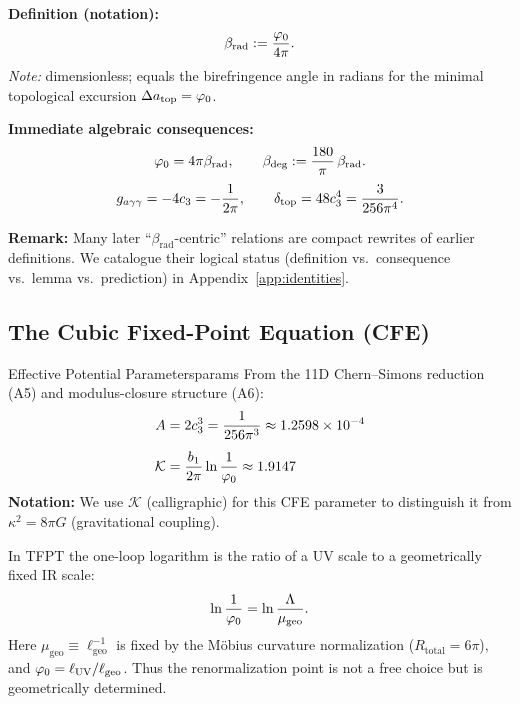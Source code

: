 \begin{tcolorbox}[colback=gray!5, colframe=gray!60, breakable,
    title={\textbf{Dictionary: $\beta_{\text{rad}}$ and Canonical Consequences}}, fonttitle=\bfseries\small]
\textbf{Definition (notation):}
\[
\beta_{\text{rad}} := \frac{\varphi_0}{4\pi}.
\]
\textit{Note:} dimensionless; equals the birefringence angle in radians for the minimal topological excursion $\Delta a_{\text{top}}=\varphi_0$.

\textbf{Immediate algebraic consequences:}
\begin{equation}
    \varphi_0 = 4\pi\beta_{\text{rad}}, 
    \qquad 
    \beta_{\text{deg}} := \frac{180}{\pi}\,\beta_{\text{rad}}.
\end{equation}
\begin{equation}
    g_{a\gamma\gamma} = -4c_3 = -\frac{1}{2\pi},
    \qquad
    \delta_{\mathrm{top}} = 48c_3^4 = \frac{3}{256\pi^4}.
\end{equation}

\textbf{Remark:} Many later ``$\beta_{\text{rad}}$-centric'' relations are compact rewrites of earlier definitions. 
We catalogue their logical status (definition vs.\ consequence vs.\ lemma vs.\ prediction) in Appendix~\ref{app:identities}.
\end{tcolorbox}

\TFPTCoreInvariantTable

\subsection{The Cubic Fixed-Point Equation (CFE)}

\begin{definition}{Effective Potential Parameters}{params}
From the 11D Chern--Simons reduction (A5) and modulus-closure structure (A6):
\begin{align}
    A &= 2c_3^3 = \frac{1}{256\pi^3} \approx 1.2598 \times 10^{-4}\\[0.5em]
    \mathcal{K} &= \frac{b_1}{2\pi}\ln\frac{1}{\varphi_0} \approx 1.9147
\end{align}
\textbf{Notation:} We use $\mathcal{K}$ (calligraphic) for this CFE parameter to 
distinguish it from $\kappa^2 = 8\pi G$ (gravitational coupling).
\end{definition}

\begin{tcolorbox}[colback=gray!5, colframe=gray!60,
    title={\textbf{Lemma (Geometric Fixing of the Log)}}, fonttitle=\bfseries\small]
In TFPT the one-loop logarithm is the ratio of a UV scale to a geometrically fixed IR scale:
\begin{equation}
    \ln\frac{1}{\varphi_0} = \ln\frac{\Lambda}{\mu_{\text{geo}}}.
\end{equation}
Here $\mu_{\text{geo}} \equiv \ell_{\text{geo}}^{-1}$ is fixed by the M\"obius curvature
normalization ($R_{\text{total}}=6\pi$), and $\varphi_0 = \ell_{\text{UV}}/\ell_{\text{geo}}$.
Thus the renormalization point is not a free choice but is geometrically determined.
\end{tcolorbox}

